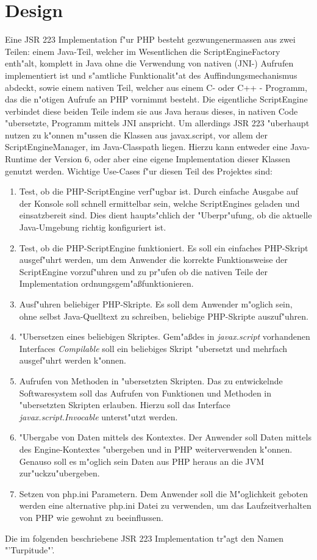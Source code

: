 \section{Design}
\label{sec:chap1:design}

Eine JSR 223 Implementation f"ur PHP besteht gezwungenermassen aus zwei Teilen: einem Java-Teil, welcher im Wesentlichen
die ScriptEngineFactory enth"alt, komplett in Java ohne die Verwendung von nativen (JNI-) Aufrufen implementiert ist und
s"amtliche Funktionalit"at des Auffindungsmechanismus abdeckt, sowie einem nativen Teil, welcher aus 
einem C- oder C++ - Programm, das die n"otigen Aufrufe an PHP vornimmt besteht.
Die eigentliche ScriptEngine verbindet diese beiden Teile indem sie aus Java heraus dieses, in nativen Code "ubersetzte, 
Programm mittels JNI anspricht.
Um allerdings JSR 223 "uberhaupt nutzen zu k"onnen m"ussen die Klassen aus javax.script, vor allem der ScriptEngineManager, 
im Java-Classpath liegen. Hierzu kann entweder eine Java-Runtime der Version 6, oder aber eine eigene Implementation dieser
Klassen genutzt werden. Wichtige Use-Cases f"ur diesen Teil des Projektes sind:
\begin{enumerate}
\item Test, ob die PHP-ScriptEngine verf"ugbar ist. Durch einfache Ausgabe auf der Konsole soll schnell ermittelbar sein, welche
    ScriptEngines geladen und einsatzbereit sind. Dies dient haupts"chlich der "Uberpr"ufung, ob die aktuelle Java-Umgebung
    richtig konfiguriert ist.
\item Test, ob die PHP-ScriptEngine funktioniert. Es soll ein einfaches PHP-Skript ausgef"uhrt werden, um dem Anwender
    die korrekte Funktionsweise der ScriptEngine vorzuf"uhren und zu pr"ufen ob die nativen Teile der Implementation
    ordnungsgem"a\ss funktionieren.
\item Ausf"uhren beliebiger PHP-Skripte. Es soll dem Anwender m"oglich sein, ohne selbst Java-Quelltext zu schreiben, beliebige
    PHP-Skripte auszuf"uhren.
\item "Ubersetzen eines beliebigen Skriptes. Gem"a\ss des in \emph{javax.script} vorhandenen Interfaces \emph{Compilable} soll 
    ein beliebiges Skript "ubersetzt und mehrfach ausgef"uhrt werden k"onnen.
\item Aufrufen von Methoden in "ubersetzten Skripten. Das zu entwickelnde Softwaresystem soll das Aufrufen von Funktionen und
    Methoden in "ubersetzten Skripten erlauben. Hierzu soll das Interface \emph{javax.script.Invocable} unterst"utzt werden.
\item "Ubergabe von Daten mittels des Kontextes. Der Anwender soll Daten mittels des Engine-Kontextes "ubergeben und in PHP
    weiterverwenden k"onnen. Genauso soll es m"oglich sein Daten aus PHP heraus an die JVM zur"uckzu"ubergeben.
\item Setzen von php.ini Parametern. Dem Anwender soll die M"oglichkeit geboten werden eine alternative php.ini Datei zu verwenden,
    um das Laufzeitverhalten von PHP wie gewohnt zu beeinflussen.
\end{enumerate}
Die im folgenden beschriebene JSR 223 Implementation tr"agt den Namen "'Turpitude"'.

